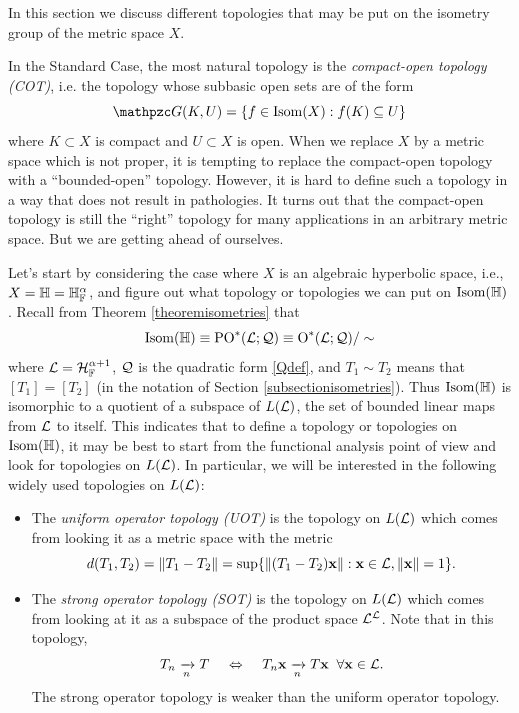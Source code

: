 In this section we discuss different topologies that may be put on the isometry group of the metric space $X$.

In the Standard Case, the most natural topology is the \emph{compact-open topology (COT)}, i.e. the topology whose subbasic open sets are of the form
\[
\GG(K,U) = \{f\in \Isom(X):f(K)\subset U\}
\]
where $K\subset X$ is compact and $U\subset X$ is open. When we replace $X$ by a metric space which is not proper, it is tempting to replace the compact-open topology with a ``bounded-open'' topology. However, it is hard to define such a topology in a way that does not result in pathologies. It turns out that the compact-open topology is still the ``right'' topology for many applications in an arbitrary metric space. But we are getting ahead of ourselves.

Let's start by considering the case where $X$ is an algebraic hyperbolic space, i.e., $X = \H = \H_\F^\alpha$, and figure out what topology or topologies we can put on $\Isom(\H)$. Recall from Theorem \ref{theoremisometries} that
\begin{equation}
\label{IsomH}
\Isom(\H) \equiv \PO^*(\LL;\QQ) \equiv \O^*(\LL;\QQ)/\sim
\end{equation}
where $\LL = \HH_\F^{\alpha + 1}$, $\mathcal Q$ is the quadratic form \eqref{Qdef}, and $T_1\sim T_2$ means that $[T_1] = [T_2]$ (in the notation of Section \ref{subsectionisometries}). Thus $\Isom(\H)$ is isomorphic to a quotient of a subspace of $L(\mathcal L)$, the set of bounded linear maps from $\mathcal L$ to itself. This indicates that to define a topology or topologies on $\Isom(\H)$, it may be best to start from the functional analysis point of view and look for topologies on $L(\mathcal L)$. In particular, we will be interested in the following widely used topologies on $L(\mathcal L)$:
\begin{itemize}
\item The \emph{uniform operator topology (UOT)} is the topology on $L(\mathcal L)$ which comes from looking it as a metric space with the metric
\[
d(T_1,T_2) = \|T_1 - T_2\| = \sup\{\|(T_1 - T_2)\mathbf x\|:\mathbf x\in\mathcal L,\|\mathbf x\| = 1\}.
\]
\item The \emph{strong operator topology (SOT)} is the topology on $L(\mathcal L)$ which comes from looking at it as a subspace of the product space $\mathcal L^\mathcal L$. Note that in this topology,
\[
T_n\xrightarrow[n]{} T \;\;\;\; \Leftrightarrow \;\;\;\; T_n \mathbf x \xrightarrow[n]{} T\mathbf x \;\;\forall \mathbf x\in\mathcal L.
\]
The strong operator topology is weaker than the uniform operator topology.
\end{itemize}

